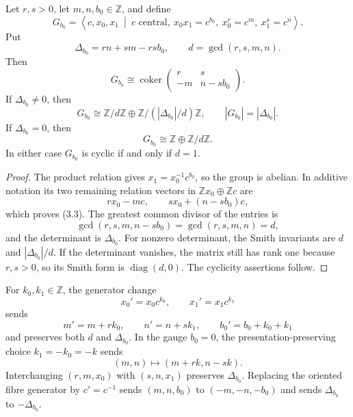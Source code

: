 \documentclass[11pt]{article}
\numberwithin{equation}{section}
\begin{document}
\begin{theorem}
Let $r,s>0$, let $m,n,b_0\in\mathbb Z$, and define
\[
 G_{b_0}=\left\langle c,x_0,x_1\ \middle|\
 c\text{ central},\ x_0x_1=c^{b_0},\ x_0^r=c^m,\ x_1^s=c^n
 \right\rangle.                                                   \tag{3.1}
\]
Put
\[
 \Delta_{b_0}=rn+sm-rsb_0,\qquad d=\gcd(r,s,m,n).                \tag{3.2}
\]
Then
\[
 G_{b_0}\cong\operatorname{coker}
 \begin{pmatrix}r&s\\-m&n-sb_0\end{pmatrix}.                     \tag{3.3}
\]
If $\Delta_{b_0}\ne0$, then
\[
 G_{b_0}\cong\mathbb Z/d\mathbb Z
       \oplus\mathbb Z/(|\Delta_{b_0}|/d)\mathbb Z,\qquad
 |G_{b_0}|=|\Delta_{b_0}|.                                        \tag{3.4}
\]
If $\Delta_{b_0}=0$, then
\[
                    G_{b_0}\cong\mathbb Z\oplus\mathbb Z/d\mathbb Z.
                                                                    \tag{3.5}
\]
In either case $G_{b_0}$ is cyclic if and only if $d=1$.
\end{theorem}

\begin{proof}
The product relation gives $x_1=x_0^{-1}c^{b_0}$, so the group is abelian.
In additive notation its two remaining relation vectors in
$\mathbb Zx_0\oplus\mathbb Zc$ are
\[
          rx_0-mc,\qquad sx_0+(n-sb_0)c,
\]
which proves (3.3).  The greatest common divisor of the entries is
\[
 \gcd(r,s,m,n-sb_0)=\gcd(r,s,m,n)=d,
\]
and the determinant is $\Delta_{b_0}$.  For nonzero determinant, the Smith
invariants are $d$ and $|\Delta_{b_0}|/d$.  If the determinant vanishes, the
matrix still has rank one because $r,s>0$, so its Smith form is
$\operatorname{diag}(d,0)$.  The cyclicity assertions follow.
\end{proof}

\begin{proposition}
For $k_0,k_1\in\mathbb Z$, the generator change
\[
 x_0'=x_0c^{k_0},\qquad x_1'=x_1c^{k_1}                            \tag{3.6}
\]
sends
\[
 m'=m+rk_0,\qquad n'=n+sk_1,\qquad b_0'=b_0+k_0+k_1             \tag{3.7}
\]
and preserves both $d$ and $\Delta_{b_0}$.  In the gauge $b_0=0$, the
presentation-preserving choice $k_1=-k_0=-k$ sends
\[
                         (m,n)\longmapsto(m+rk,n-sk).              \tag{3.8}
\]
Interchanging $(r,m,x_0)$ with $(s,n,x_1)$ preserves
$\Delta_{b_0}$.  Replacing the oriented fibre generator by $c'=c^{-1}$
sends $(m,n,b_0)$ to $(-m,-n,-b_0)$ and sends
$\Delta_{b_0}$ to $-\Delta_{b_0}$.
\end{proposition}
\end{document}
